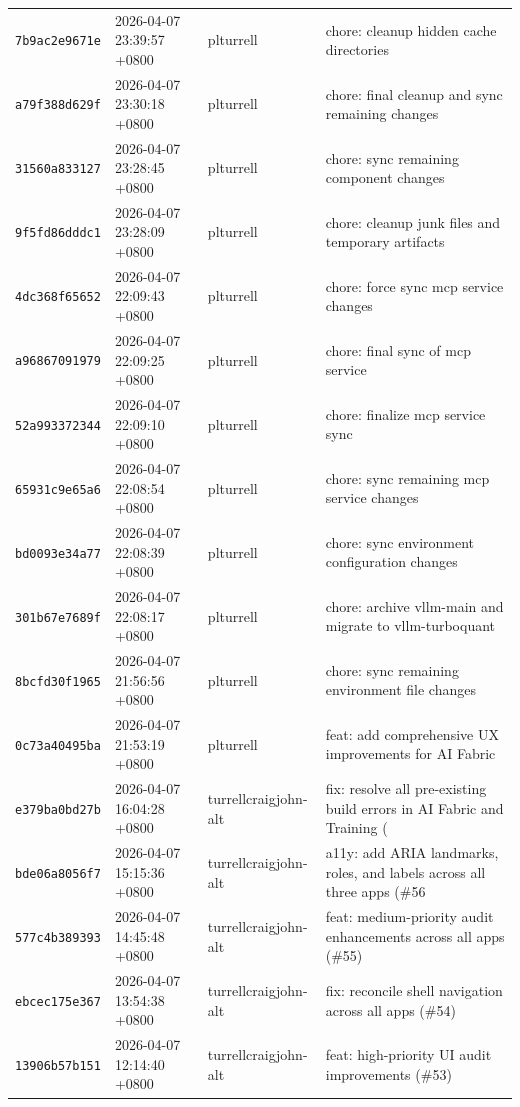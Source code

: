 \documentclass[11pt,a4paper]{article}
\begin{document}
\begin{longtable}{|p{2.2cm}|p{3.2cm}|l|p{6cm}|}
\texttt{7b9ac2e9671e} & 2026-04-07 23:39:57 +0800 & plturrell & chore: cleanup hidden cache directories \\
\texttt{a79f388d629f} & 2026-04-07 23:30:18 +0800 & plturrell & chore: final cleanup and sync remaining changes \\
\texttt{31560a833127} & 2026-04-07 23:28:45 +0800 & plturrell & chore: sync remaining component changes \\
\texttt{9f5fd86dddc1} & 2026-04-07 23:28:09 +0800 & plturrell & chore: cleanup junk files and temporary artifacts \\
\texttt{4dc368f65652} & 2026-04-07 22:09:43 +0800 & plturrell & chore: force sync mcp service changes \\
\texttt{a96867091979} & 2026-04-07 22:09:25 +0800 & plturrell & chore: final sync of mcp service \\
\texttt{52a993372344} & 2026-04-07 22:09:10 +0800 & plturrell & chore: finalize mcp service sync \\
\texttt{65931c9e65a6} & 2026-04-07 22:08:54 +0800 & plturrell & chore: sync remaining mcp service changes \\
\texttt{bd0093e34a77} & 2026-04-07 22:08:39 +0800 & plturrell & chore: sync environment configuration changes \\
\texttt{301b67e7689f} & 2026-04-07 22:08:17 +0800 & plturrell & chore: archive vllm-main and migrate to vllm-turboquant \\
\texttt{8bcfd30f1965} & 2026-04-07 21:56:56 +0800 & plturrell & chore: sync remaining environment file changes \\
\texttt{0c73a40495ba} & 2026-04-07 21:53:19 +0800 & plturrell & feat: add comprehensive UX improvements for AI Fabric \\
\texttt{e379ba0bd27b} & 2026-04-07 16:04:28 +0800 & turrellcraigjohn-alt & fix: resolve all pre-existing build errors in AI Fabric and Training ( \\
\texttt{bde06a8056f7} & 2026-04-07 15:15:36 +0800 & turrellcraigjohn-alt & a11y: add ARIA landmarks, roles, and labels across all three apps (\#56 \\
\texttt{577c4b389393} & 2026-04-07 14:45:48 +0800 & turrellcraigjohn-alt & feat: medium-priority audit enhancements across all apps (\#55) \\
\texttt{ebcec175e367} & 2026-04-07 13:54:38 +0800 & turrellcraigjohn-alt & fix: reconcile shell navigation across all apps (\#54) \\
\texttt{13906b57b151} & 2026-04-07 12:14:40 +0800 & turrellcraigjohn-alt & feat: high-priority UI audit improvements (\#53) \\

\end{longtable}
\end{document}
